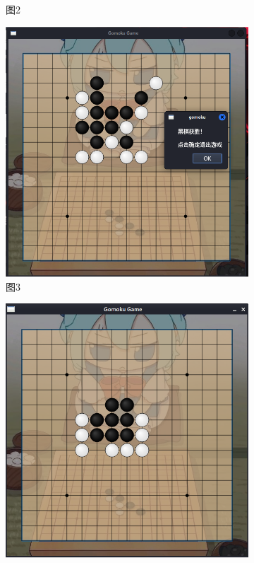 \documentclass[UTF8]{ctexart}
\begin{document}
\begin{figure}[htbp]
\begin{subfigure}[b]{0.3\textwidth}
        \caption{图2}
        \label{fig:image2}
    \end{subfigure}%
    \hfill
    \begin{subfigure}[b]{0.3\textwidth}
        \centering
        \includegraphics[width=\textwidth]{screenshoot3.png}
        \caption{图3}
        \label{fig:image3}
    \end{subfigure}%
        \hfill
    \begin{subfigure}[b]{0.3\textwidth}
        \centering
        \includegraphics[width=\textwidth]{screenshoot4.png}

\end{subfigure}
\end{figure}
\end{document}

